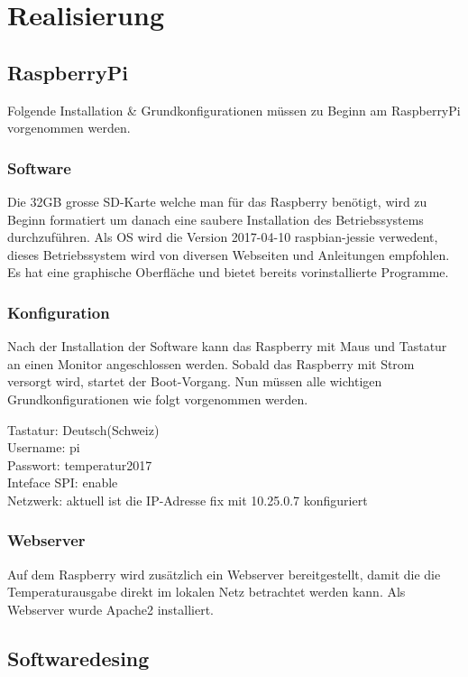 \section{Realisierung}

\subsection{RaspberryPi}

Folgende Installation \& Grundkonfigurationen müssen zu Beginn am RaspberryPi vorgenommen werden.

\subsubsection{Software}
Die 32GB grosse SD-Karte welche man für das Raspberry benötigt, wird zu Beginn formatiert um danach eine saubere Installation des Betriebssystems durchzuführen. Als OS wird die Version 2017-04-10 raspbian-jessie verwedent, dieses Betriebssystem wird von diversen Webseiten und Anleitungen empfohlen. Es hat eine graphische Oberfläche und bietet bereits vorinstallierte Programme.

\subsubsection{Konfiguration}
Nach der Installation der Software kann das Raspberry mit Maus und Tastatur an einen Monitor angeschlossen werden. Sobald das Raspberry mit Strom versorgt wird, startet der Boot-Vorgang.
Nun müssen alle wichtigen Grundkonfigurationen wie folgt vorgenommen werden.

Tastatur: Deutsch(Schweiz)\\
Username: pi\\
Passwort: temperatur2017\\
Inteface SPI: enable\\
Netzwerk: aktuell ist die IP-Adresse fix mit 10.25.0.7 konfiguriert

\subsubsection{Webserver}
Auf dem Raspberry wird zusätzlich ein Webserver bereitgestellt, damit die die Temperaturausgabe direkt im lokalen Netz betrachtet werden kann. Als Webserver wurde Apache2 installiert.


\subsection{Softwaredesing}

